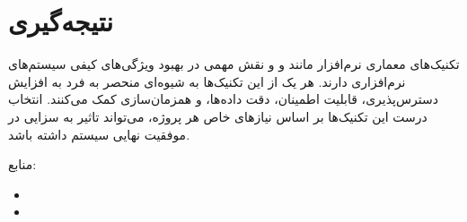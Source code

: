 \section{نتیجه‌گیری}
تکنیک‌های معماری نرم‌افزار مانند
و
و
نقش مهمی در بهبود ویژگی‌های کیفی سیستم‌های نرم‌افزاری دارند. هر یک از این تکنیک‌ها به شیوه‌ای منحصر به فرد به افزایش دسترس‌پذیری، قابلیت اطمینان، دقت داده‌ها، و همزمان‌سازی کمک می‌کنند. انتخاب درست این تکنیک‌ها بر اساس نیازهای خاص هر پروژه، می‌تواند تاثیر به سزایی در موفقیت نهایی سیستم داشته باشد.

منابع:

\begin{itemize}
	\item {}
	\item {}
\end{itemize}


